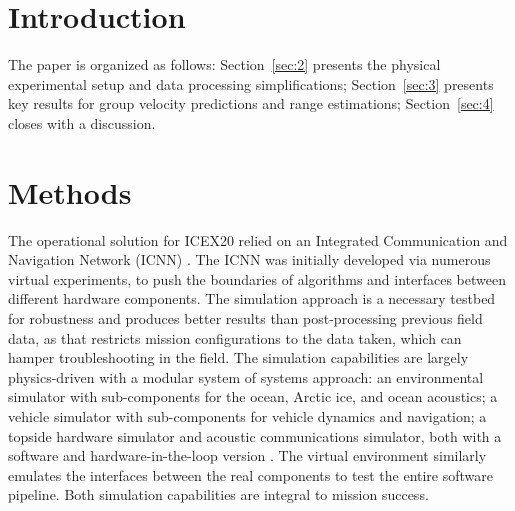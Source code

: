 \maketitle


\section{\label{sec:1} Introduction}

The paper is organized as follows: Section~\ref{sec:2} presents the physical
experimental setup and data processing simplifications; Section~\ref{sec:3} presents key results for group velocity predictions and range estimations; Section~\ref{sec:4} closes with a discussion.

\section{\label{sec:2} Methods}

The operational solution for ICEX20 relied on an Integrated Communication and Navigation Network (ICNN) \citep{schneider_self-adapting_2020,randeni_construction_2020,randeni_high-resolution_2021}.
The ICNN was initially developed via numerous virtual experiments, to push the boundaries of algorithms and interfaces between different hardware components.
The simulation approach is a necessary testbed for robustness and produces better results than post-processing previous field data, as that restricts mission configurations to the data taken, which can hamper troubleshooting in the field.
The simulation capabilities are largely physics-driven with a modular system of systems approach: an environmental simulator with sub-components for the ocean, Arctic ice, and ocean acoustics; a vehicle simulator with sub-components for vehicle dynamics and navigation; a topside hardware simulator and acoustic communications simulator, both with a software and hardware-in-the-loop version \citep{schneider_netsim_2018}.
The virtual environment similarly emulates the interfaces between the real components to test the entire software pipeline.
Both simulation capabilities are integral to mission success.


